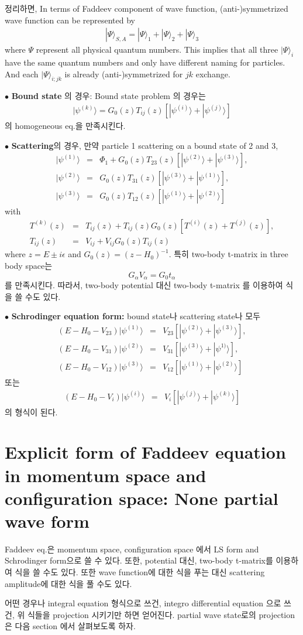 \documentclass[11pt]{article}
\newcommand{\bea}{\begin{eqnarray}}
\newcommand{\eea}{\end{eqnarray}}
\newcommand{\no}{\nonumber \\}
\newcommand{\ra}{\rangle}
\begin{document}
정리하면,
In terms of Faddeev component of wave function, (anti-)symmetrized wave function
can be represented by
\bea
|\Psi\ra_{S,A}=|\Psi\ra_1+|\Psi\ra_2+|\Psi\ra_3
\eea
where $\Psi$ represent all physical quantum numbers. This implies that
all three $|\Psi\ra_i$ have the same quantum numbers and only have 
different naming for particles. And each $|\Psi\ra_{i;jk}$
is already (anti-)symmetrized for $jk$ exchange.

$\bullet$ {\bf Bound state} 의 경우:
Bound state problem 의 경우는 
\bea
|\psi^{(k)}\ra=G_0(z)T_{ij}(z)[|\psi^{(i)}\ra+|\psi^{(j)}\ra]
\eea
의 homogeneous eq.을 만족시킨다.

$\bullet$ {\bf Scattering}의 경우, 만약 particle 1 scattering on a bound state of 2 and 3,
\bea
|\psi^{(1)}\ra&=&\Phi_1+G_0(z)T_{23}(z)[|\psi^{(2)}\ra+|\psi^{(3)}\ra],\no 
|\psi^{(2)}\ra&=&G_0(z)T_{31}(z)[|\psi^{(3)}\ra+|\psi^{(1)}\ra],\no
|\psi^{(3)}\ra&=&G_0(z)T_{12}(z)[|\psi^{(1)}\ra+|\psi^{(2)}\ra]
\eea
with
\bea
T^{(k)}(z)&=&T_{ij}(z)+T_{ij}(z) G_0(z)[T^{(i)}(z)+T^{(j)}(z)],\no
T_{ij}(z)&=&V_{ij}+V_{ij}G_0(z)T_{ij}(z)
\eea
where $z=E\pm i\epsilon$ and $G_0(z)=(z-H_0)^{-1}$. 
특히 two-body t-matrix in three body space는
$$G_\alpha V_\alpha=G_0 t_\alpha$$
를 만족시킨다. 따라서, two-body potential 대신 two-body t-matrix
를 이용하여 식을 쓸 수도 있다.

 $\bullet$ {\bf  Schrodinger equation form: } bound state나
 scattering state나 모두
\bea
(E-H_0-V_{23})|\psi^{(1)}\ra&=&V_{23}[|\psi^{(2)}\ra+|\psi^{(3)}\ra],\no 
(E-H_0-V_{31})|\psi^{(2)}\ra&=&V_{31}[|\psi^{(3)}\ra+|\psi^{1)}\ra],\no 
(E-H_0-V_{12})|\psi^{(3)}\ra&=&V_{12}[|\psi^{(1)}\ra+|\psi^{(2)}\ra]
\eea
또는
\bea
(E-H_0-V_{i})|\psi^{(i)}\ra&=&V_{i}[|\psi^{(j)}\ra+|\psi^{(k)}\ra]
\eea
의 형식이 된다.




\section{Explicit form of Faddeev equation in momentum space
and configuration space: None partial wave form}
Faddeev eq.은  momentum space, configuration space 에서
LS form and Schrodinger form으로 쓸 수 있다. 또한, potential 대신, two-body t-matrix를
이용하여 식을 쓸 수도 있다.
또한
wave function에 대한 식을 푸는 대신 scattering amplitude에 대한 
식을 풀 수도 있다. 

어떤 경우나 integral equation 형식으로 쓰건, integro differential equation 으로 쓰건, 위 식들을 projection 시키기만 하면
얻어진다. partial wave state로의 projection은 
다음 section 에서  살펴보도록 하자. 
\end{document}

